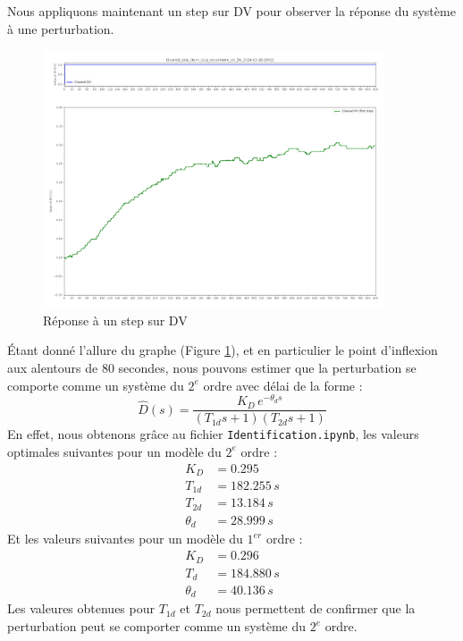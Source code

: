 Nous appliquons maintenant un step sur DV pour observer la réponse du système à une perturbation.
\begin{figure}[H]
    \centering
    \includegraphics[width=0.9\textwidth]{../Plots/Graphical_methods_Cleaned_data_Open_loop_experiment_on_DV_2024-03-18-20h01.png}
    \caption{Réponse à un step sur DV}
    \label{fig:DV_step_response}
\end{figure}

Étant donné l'allure du graphe (Figure \ref{fig:DV_step_response}), et en particulier le point d'inflexion aux alentours de 80 secondes, nous pouvons estimer que la perturbation se comporte comme un système du $2^{e}$ ordre avec délai de la forme :
\begin{equation}
    \hat{D}(s) = \frac{K_D\,e^{-\theta_d s}}{(T_{1d}s + 1)(T_{2d}s + 1)}
\end{equation}
En effet, nous obtenons grâce au fichier \texttt{Identification.ipynb}, les valeurs optimales suivantes pour un modèle du $2^{e}$ ordre :
\begin{align*}
    K_D &= 0.295 \\
    T_{1d} &= 182.255 \,s \\
    T_{2d} &= 13.184 \,s \\
    \theta_d &= 28.999 \,s
\end{align*}
Et les valeurs suivantes pour un modèle du $1^{er}$ ordre :
\begin{align*}
    K_D &= 0.296 \\
    T_{d} &= 184.880 \,s \\
    \theta_d &= 40.136 \,s
\end{align*}
Les valeures obtenues pour $T_{1d}$ et $T_{2d}$ nous permettent de confirmer que la perturbation peut se comporter comme un système du $2^{e}$ ordre.


